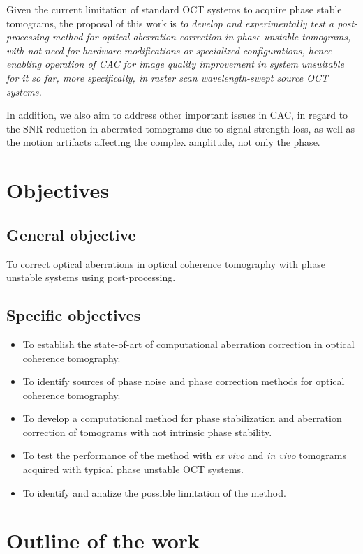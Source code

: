 Given the current limitation of standard OCT systems to acquire phase stable tomograms, the proposal of this work is \textit{to develop and experimentally test a post-processing method for optical aberration correction in phase unstable tomograms, with not need for hardware modifications or specialized configurations, hence enabling operation of CAC for image quality improvement in system unsuitable for it so far, more specifically, in raster scan wavelength-swept source OCT systems.}

In addition, we also aim to address other important issues in CAC, in regard to the SNR reduction in aberrated tomograms due to signal strength loss, as well as the motion artifacts affecting the complex amplitude, not only the phase.

\section{Objectives}

\subsection{General objective}

To correct optical aberrations in optical coherence tomography with phase unstable systems using post-processing.

\subsection{Specific objectives}

\begin{itemize}
    \item To establish the state-of-art of computational aberration correction in optical coherence tomography.
    \item To identify sources of phase noise and phase correction methods for optical coherence tomography.
    \item To develop a computational method for phase stabilization and aberration correction of tomograms with not intrinsic phase stability.
    \item To test the performance of the method with \textit{ex vivo} and \textit{in vivo} tomograms acquired with typical phase unstable OCT systems.
    \item To identify and analize the possible limitation of the method.
\end{itemize}

\section{Outline of the work}

